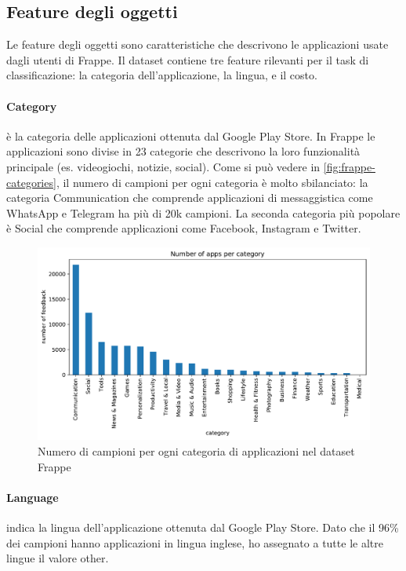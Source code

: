 \documentclass[12pt,italian]{report}
\begin{document}
\subsection{Feature degli oggetti}
Le feature degli oggetti sono caratteristiche che descrivono le applicazioni usate dagli utenti di Frappe. Il dataset contiene tre feature rilevanti per il task di classificazione: la categoria dell'applicazione, la lingua, e il costo.

\paragraph{Category} è la categoria delle applicazioni ottenuta dal Google Play Store. In Frappe le applicazioni sono divise in 23 categorie che descrivono la loro funzionalità principale (es. videogiochi, notizie, social). Come si può vedere in \autoref{fig:frappe-categories}, il numero di campioni per ogni categoria è molto sbilanciato: la categoria Communication che comprende applicazioni di messaggistica come WhatsApp e Telegram ha più di 20k campioni. La seconda categoria più popolare è Social che comprende applicazioni come Facebook, Instagram e Twitter.

\begin{figure}
  \centering
  \includegraphics[width=\linewidth]{immagini/frappe-category.pdf}
  \caption{Numero di campioni per ogni categoria di applicazioni nel dataset Frappe}
  \label{fig:frappe-categories}
\end{figure}

\paragraph{Language} indica la lingua dell'applicazione ottenuta dal Google Play Store. Dato che il 96\% dei campioni hanno applicazioni in lingua inglese, ho assegnato a tutte le altre lingue il valore other.
\end{document}
